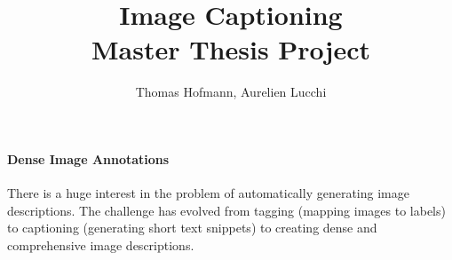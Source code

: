 \documentclass{article}
\author{Thomas Hofmann, Aurelien Lucchi}
\title{Image Captioning \\ Master Thesis Project}
\begin{document}
\maketitle

\paragraph{Dense Image Annotations}

There is a huge interest in the problem of automatically generating image descriptions. The challenge has evolved from tagging (mapping images to labels) to captioning (generating short text snippets) to creating dense and comprehensive image descriptions.  



\end{document}
